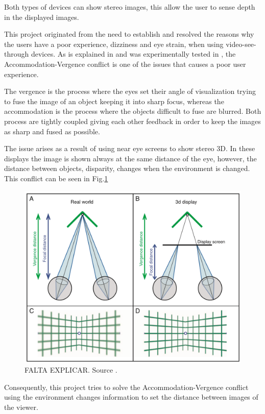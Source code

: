 \documentclass[10pt,a4paper,twocolumn,twoside]{article}
\begin{document}
	Both types of devices can show stereo images, this allow the user to sense depth in the displayed images. 
	
	This project originated from the need to establish and resolved the reasons why the users have a poor experience, dizziness and eye strain, when using video-see-through devices. As is explained in \cite{disconfortReview} and was experimentally tested in \cite{vergenceDisconfort}, the Accommodation-Vergence conflict is one of the issues that causes a poor user experience.
	
	The vergence is the process where the eyes set their angle of visualization trying to fuse the image of an object keeping it into sharp focus, whereas the accommodation is the process where the objects difficult to fuse are blurred. Both process are tightly coupled giving each other feedback in order to keep the images as sharp and fused as possible. 
	
	The issue arises as a result of using near eye screens to show stereo 3D. In these displays the image is shown always at the same distance of the eye, however, the distance between objects, disparity,  changes when the environment is changed. This conflict can be seen in Fig.\ref{fig:vergence}
	
	\begin{figure}
		\centering
		\includegraphics[width=1\linewidth]{img/vergencia.png}
		\caption{ FALTA EXPLICAR. Source \cite{vergenceDisconfort}.}
		\label{fig:vergence}
	\end{figure}
	
	
	Consequently, this project tries to solve the Accommodation-Vergence conflict using the environment changes information to set the distance between images of the viewer. 
	
\end{document}
